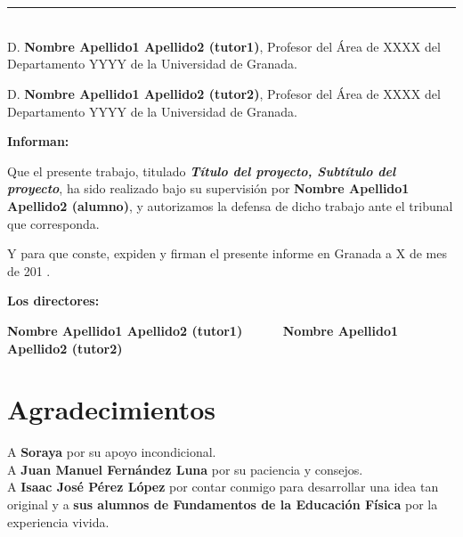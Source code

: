 \chapter*{}
\thispagestyle{empty}

\noindent\rule[-1ex]{\textwidth}{2pt}\\[4.5ex]

D. \textbf{Nombre Apellido1 Apellido2 (tutor1)}, Profesor del Área de XXXX del Departamento YYYY de la Universidad de Granada.

\vspace{0.5cm}

D. \textbf{Nombre Apellido1 Apellido2 (tutor2)}, Profesor del Área de XXXX del Departamento YYYY de la Universidad de Granada.


\vspace{0.5cm}

\textbf{Informan:}

\vspace{0.5cm}

Que el presente trabajo, titulado \textit{\textbf{Título del proyecto, Subtítulo del proyecto}},
ha sido realizado bajo su supervisión por \textbf{Nombre Apellido1 Apellido2 (alumno)}, y autorizamos la defensa de dicho trabajo ante el tribunal
que corresponda.

\vspace{0.5cm}

Y para que conste, expiden y firman el presente informe en Granada a X de mes de 201 .

\vspace{1cm}

\textbf{Los directores:}

\vspace{5cm}

\noindent \textbf{Nombre Apellido1 Apellido2 (tutor1) \ \ \ \ \ Nombre Apellido1 Apellido2 (tutor2)}

\chapter*{Agradecimientos}
\thispagestyle{empty}

       \vspace{1cm}


A \textbf{Soraya} por su apoyo incondicional.\\

A \textbf{Juan Manuel Fernández Luna} por su paciencia y consejos.\\

A \textbf{Isaac José Pérez López} por contar conmigo para desarrollar una idea tan original y a \textbf{sus alumnos de Fundamentos de la Educación Física} por la experiencia vivida.

